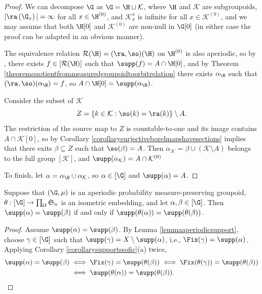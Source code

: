 \begin{proof}
We can decompose $\G$ as $\G=\H\sqcup\mathcal{K}$, where $\H$ and $\mathcal{K}$ are subgroupoids, $|\ra\left(\G_x\right)|=\infty$ for all $x\in\H^{(0)}$, and $\mathcal{K}^x_x$ is infinite for all $x\in\mathcal{K}^{(0)}$, and we may assume that both $\H[0]$ and $\mathcal{K}^{(0)}$ are non-null in $\G[0]$ (in either case the proof can be adapted in an obvious manner).

The equivalence relation $\mathcal{R}(\H)=(\ra,\so)(\H)$ on $\H^{(0)}$ is also aperiodic, so by \cite[Lemma 4.10]{MR2583950}, there exists $f\in[\mathcal{R}(\H)]$ such that $\supp(f)=A\cap\H[0]$, and by Theorem \ref{theoremquotientfrommeasuredgroupoidtoorbitrelation} there exists $\alpha_{\H}$ such that $(\ra,\so)(\alpha_{\H})=f$, so $A\cap\H[0]=\supp(\alpha_{\H})$.

Consider the subset of $\mathcal{K}$
\[Z=\left\{k\in \mathcal{K}:\so(k)=\ra(k)\right\}\setminus A.\]
The restriction of the source map to $Z$ is countable-to-one and its image contains $A\cap\mathcal{K}[0]$, so by Corollary \ref{corollarysurjectiveborelmapshavesections} implies that there exits $\beta\subseteq Z$ such that $\so(\beta)=A$. Then $\alpha_{\mathcal{K}}=\beta\cup(\mathcal{K}\setminus A)$ belongs to the full group $[\mathcal{K}]$, and $\supp(\alpha_\mathcal{K})=A\cap\mathcal{K}^{(0)}$

To finish, let $\alpha=\alpha_{\H}\cup\alpha_{\mathcal{K}}$, so $\alpha\in[\G]$ and $\supp(\alpha)=A$.\qedhere
\end{proof}

\begin{lemma}\label{lemmasupportspreservedunderembeddings}
Suppose that $(\G,\mu)$ is an aperiodic probability measure-preserving groupoid, $\theta:[\G]\to\prod_{\mathcal{U}}\mathfrak{S}_n$ is an isometric embedding, and let $\alpha,\beta\in[\G]$. Then $\supp(\alpha)=\supp(\beta)$ if and only if $\supp(\theta(\alpha))=\supp(\theta(\beta))$.
\end{lemma}
\begin{proof}
Assume $\supp(\alpha)=\supp(\beta)$. By Lemma \ref{lemmaaperiodicsupport}, choose $\gamma\in[\G]$ such that $\supp(\gamma)=X\setminus\supp(\alpha)$, i.e., $\Fix(\gamma)=\supp(\alpha)$. Applying Corollary \ref{corollarysupportssofic}(a) twice,
\begin{align*}
\supp(\alpha)=\supp(\beta)&\iff\Fix(\gamma)=\supp(\theta(\beta))\iff\Fix(\theta(\gamma))=\supp(\theta(\beta))\\
&\iff\supp(\theta(\alpha))=\supp(\theta(\beta)).\qedhere
\end{align*}
\end{proof}

